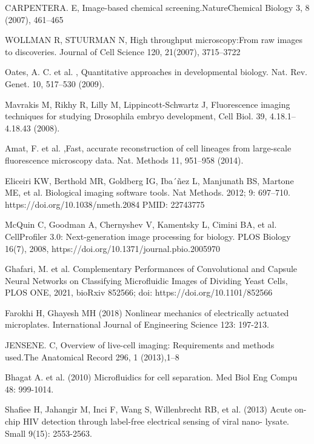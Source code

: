 \documentclass[conference]{IEEEtran}
\begin{document}
\begin{thebibliography}{00}


CARPENTERA. E, Image-based chemical screening.NatureChemical Biology 3, 8 (2007), 461–465

WOLLMAN R, STUURMAN  N, High throughput microscopy:From raw images to discoveries. Journal of Cell Science 120, 21(2007), 3715–3722

Oates, A. C. et al. , Quantitative approaches in developmental biology. Nat. Rev. Genet. 10, 517–530 (2009).


Mavrakis M, Rikhy R, Lilly M, Lippincott-Schwartz J, Fluorescence imaging techniques for studying Drosophila embryo development, Cell Biol. 39, 4.18.1–4.18.43 (2008).


Amat, F. et al. ,Fast, accurate reconstruction of cell lineages from large-scale fluorescence microscopy data. Nat. Methods 11, 951–958 (2014).


Eliceiri KW, Berthold MR, Goldberg IG, Iba´ñez L, Manjunath BS, Martone ME, et al. Biological imaging software tools. Nat Methods. 2012; 9: 697–710. https://doi.org/10.1038/nmeth.2084 PMID: 22743775

McQuin C, Goodman A, Chernyshev V, Kamentsky L, Cimini BA, et al. CellProfiler 3.0: Next-generation image processing for biology. PLOS Biology 16(7), 2008, https://doi.org/10.1371/journal.pbio.2005970

Ghafari, M. et al. Complementary Performances of Convolutional and Capsule Neural Networks on Classifying Microfluidic Images of Dividing Yeast Cells, PLOS ONE, 2021, bioRxiv 852566; doi: https://doi.org/10.1101/852566

Farokhi H, Ghayesh MH (2018) Nonlinear mechanics of electrically actuated microplates. International Journal of Engineering Science 123: 197-213.

JENSENE. C, Overview of live-cell imaging: Requirements and methods used.The Anatomical Record 296, 1 (2013),1–8


 Bhagat A. et al. (2010) Microfluidics for cell separation. Med Biol Eng Compu 48: 999-1014.

Shafiee H, Jahangir M, Inci F, Wang S, Willenbrecht RB, et al. (2013) Acute on-chip HIV detection through label-free electrical sensing of viral nano- lysate. Small 9(15): 2553-2563.


\end{thebibliography}
\end{document}
